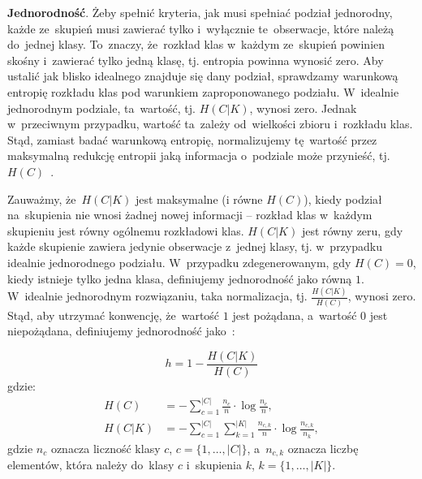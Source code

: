 \documentclass{praca1}
\begin{document}
\textbf{Jednorodność}. Żeby spełnić kryteria, jak musi spełniać podział jednorodny, każde ze~skupień musi zawierać tylko i~wyłącznie te~obserwacje, które należą do~jednej klasy. To~znaczy, że~rozkład klas w~każdym ze~skupień powinien skośny i~zawierać tylko jedną klasę, tj. entropia powinna wynosić zero. Aby ustalić jak blisko idealnego znajduje się dany podział, sprawdzamy warunkową entropię rozkładu klas pod warunkiem zaproponowanego podziału. W~idealnie jednorodnym podziale, ta~wartość, tj. $H(C|K)$, wynosi zero. Jednak w~przeciwnym przypadku, wartość ta~zależy od~wielkości zbioru i~rozkładu klas. Stąd, zamiast badać warunkową entropię, normalizujemy tę~wartość przez maksymalną redukcję entropii jaką informacja o~podziale może przynieść, tj. $H(C)$~\cite{Rosenberg2007:vmeasure}.

Zauważmy, że~$H(C|K)$ jest maksymalne (i równe $H(C)$), kiedy podział na~skupienia nie wnosi żadnej nowej informacji -- rozkład klas w~każdym skupieniu jest równy ogólnemu rozkładowi klas. $H(C|K)$ jest równy zeru, gdy każde skupienie zawiera jedynie obserwacje z~jednej klasy, tj. w~przypadku idealnie jednorodnego podziału. W~przypadku zdegenerowanym, gdy $H(C) = 0$, kiedy istnieje tylko jedna klasa, definiujemy jednorodność jako równą $1$. W~idealnie jednorodnym rozwiązaniu, taka normalizacja, tj. $\frac{H(C|K)}{H(C)}$, wynosi zero. Stąd, aby utrzymać konwencję, że~wartość $1$ jest pożądana, a~wartość $0$ jest niepożądana, definiujemy jednorodność jako~\cite{Rosenberg2007:vmeasure}:

\begin{equation}
h = %
1 - \frac{H(C|K)}{H(C)} %
\end{equation}
gdzie:
\begin{align*}
H(C) & = - \sum\limits_{c = 1}^{|C|}\frac{n_c}{n}\cdot \log{\frac{n_c}{n}},  \\
H(C|K) & = - \sum\limits_{c = 1}^{|C|}\sum\limits_{k = 1}^{|K|}\frac{n_{c,k}}{n}\cdot \log{\frac{n_{c,k}}{n_k}},
\end{align*}
gdzie $n_c$ oznacza liczność klasy $c$, $c = \{1,\ldots, |C|\}$, a~$n_{c,k}$ oznacza liczbę elementów, która należy do~klasy $c$ i~skupienia $k$, $k = \{1,\ldots, |K|\}$.
\end{document}
